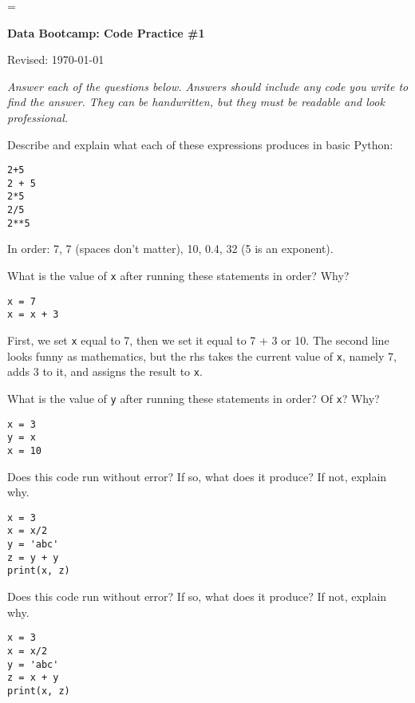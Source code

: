 \documentclass[11pt]{exam}
\begin{document}
\parskip=\bigskipamount
\parindent=0.0in
\thispagestyle{empty}


\bigskip\bigskip
\centerline{\Large \bf Data Bootcamp:  Code Practice \#1}
\centerline{Revised: \today}

{\it Answer each of the questions below.
Answers should include any code you write to find the answer.
They can be handwritten, but they must be readable and look professional.}

\begin{questions}
\item Describe and explain what each of these expressions produces in basic Python:
\begin{verbatim}
2+5
2 + 5
2*5
2/5
2**5
\end{verbatim}

\begin{solution}
In order:  7, 7 (spaces don't matter), 10, 0.4, 32 (5 is an exponent).
\end{solution}

\item What is the value of \texttt{x} after running these statements in order? Why?
\begin{verbatim}
x = 7
x = x + 3
\end{verbatim}

\begin{solution}
First, we set {\tt x} equal to 7, then we set it equal to 7 + 3 or 10.
The second line looks funny as mathematics, but the rhs takes the current value of {\tt x}, namely 7,
adds 3 to it, and assigns the result to {\tt x}.
\end{solution}

\item What is the value of \texttt{y} after running these statements in order?
Of \texttt{x}?  Why?
\begin{verbatim}
x = 3
y = x
x = 10
\end{verbatim}

\item Does this code run without error?  If so, what does it produce?  If not, explain why.
\begin{verbatim}
x = 3
x = x/2
y = 'abc'
z = y + y
print(x, z)
\end{verbatim}

\item Does this code run without error?  If so, what does it produce?  If not, explain why.
\begin{verbatim}
x = 3
x = x/2
y = 'abc'
z = x + y
print(x, z)
\end{verbatim}


\end{questions}
\end{document}
